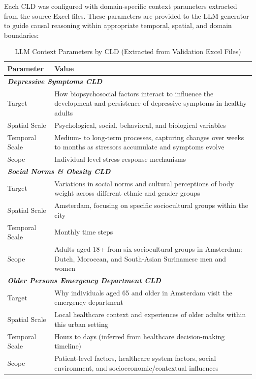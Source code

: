 Each CLD was configured with domain-specific context parameters extracted from the source Excel files. These parameters are provided to the LLM generator to guide causal reasoning within appropriate temporal, spatial, and domain boundaries:

\begin{table}[H]
\centering
\caption{LLM Context Parameters by CLD (Extracted from Validation Excel Files)}
\label{tab:cld_context}
\footnotesize
\begin{tabularx}{\textwidth}{@{}l X@{}}
\toprule
\textbf{Parameter} & \textbf{Value} \\
\midrule
\multicolumn{2}{l}{\textit{\textbf{Depressive Symptoms CLD}}} \\
Target & How biopsychosocial factors interact to influence the development and persistence of depressive symptoms in healthy adults \\
Spatial Scale & Psychological, social, behavioral, and biological variables \\
Temporal Scale & Medium- to long-term processes, capturing changes over weeks to months as stressors accumulate and symptoms evolve \\
Scope & Individual-level stress response mechanisms \\
\midrule
\multicolumn{2}{l}{\textit{\textbf{Social Norms \& Obesity CLD}}} \\
Target & Variations in social norms and cultural perceptions of body weight across different ethnic and gender groups \\
Spatial Scale & Amsterdam, focusing on specific sociocultural groups within the city \\
Temporal Scale & Monthly time steps \\
Scope & Adults aged 18+ from six sociocultural groups in Amsterdam: Dutch, Moroccan, and South-Asian Surinamese men and women \\
\midrule
\multicolumn{2}{l}{\textit{\textbf{Older Persons Emergency Department CLD}}} \\
Target & Why individuals aged 65 and older in Amsterdam visit the emergency department \\
Spatial Scale & Local healthcare context and experiences of older adults within this urban setting \\
Temporal Scale & Hours to days (inferred from healthcare decision-making timeline) \\
Scope & Patient-level factors, healthcare system factors, social environment, and socioeconomic/contextual influences \\
\bottomrule
\end{tabularx}
\end{table}

